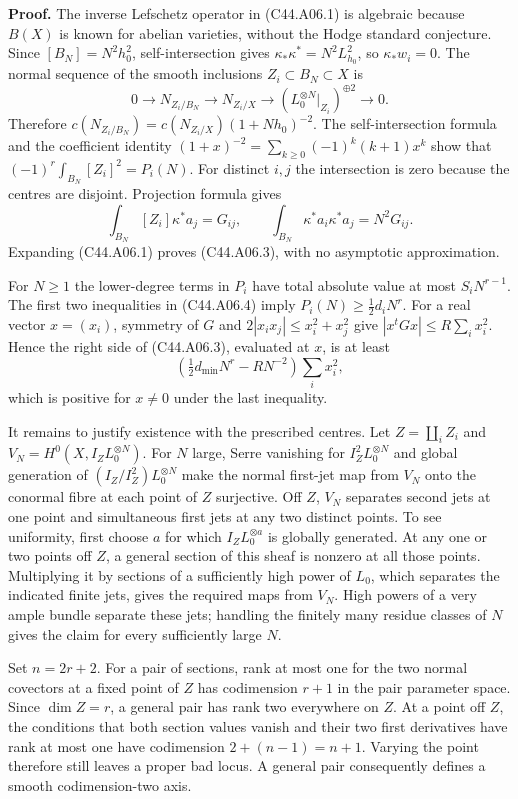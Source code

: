 \documentclass[11pt]{article}
\theoremstyle{remark}\newtheorem{remark}[theorem]{Remark}
\begin{document}
\textbf{Proof.}
The inverse Lefschetz operator in (C44.A06.1) is algebraic because
$B(X)$ is known for abelian varieties, without the Hodge standard
conjecture. Since $[B_N]=N^2h_0^2$, self-intersection gives
$\kappa_*\kappa^*=N^2L_{h_0}^2$, so $\kappa_*w_i=0$.
The normal sequence of the smooth inclusions $Z_i\subset B_N\subset X$
is
\[
 0\longrightarrow N_{Z_i/B_N}\longrightarrow N_{Z_i/X}
 \longrightarrow (L_0^{\otimes N}|_{Z_i})^{\oplus2}
 \longrightarrow0.
\]
Therefore
$c(N_{Z_i/B_N})=c(N_{Z_i/X})(1+Nh_0)^{-2}$.
The self-intersection formula and the coefficient identity
$(1+x)^{-2}=\sum_{k\ge0}(-1)^k(k+1)x^k$ show that
$(-1)^r\int_{B_N}[Z_i]^2=P_i(N)$.
For distinct $i,j$ the intersection is zero because the centres
are disjoint. Projection formula gives
\[
 \int_{B_N}[Z_i]\kappa^*a_j=G_{ij},\qquad
 \int_{B_N}\kappa^*a_i\kappa^*a_j=N^2G_{ij}.
\]
Expanding (C44.A06.1) proves (C44.A06.3), with no asymptotic
approximation.

For $N\ge1$ the lower-degree terms in $P_i$ have total absolute
value at most $S_iN^{r-1}$. The first two inequalities in
(C44.A06.4) imply $P_i(N)\ge\tfrac12d_iN^r$.
For a real vector $x=(x_i)$, symmetry of $G$ and
$2|x_ix_j|\le x_i^2+x_j^2$ give
$|x^tGx|\le R\sum_i x_i^2$. Hence the right side of
(C44.A06.3), evaluated at $x$, is at least
\[
 \left(\tfrac12d_{\min}N^r-RN^{-2}\right)\sum_i x_i^2,
\]
which is positive for $x\ne0$ under the last inequality.

It remains to justify existence with the prescribed centres.
Let $Z=\coprod_iZ_i$ and $V_N=H^0(X,I_ZL_0^{\otimes N})$.
For $N$ large, Serre vanishing for $I_Z^2L_0^{\otimes N}$ and
global generation of $(I_Z/I_Z^2)L_0^{\otimes N}$ make the
normal first-jet map from $V_N$ onto the conormal fibre at each
point of $Z$ surjective. Off $Z$, $V_N$ separates second jets at
one point and simultaneous first jets at any two distinct points.
To see uniformity, first choose $a$ for which $I_ZL_0^{\otimes a}$
is globally generated. At any one or two points off $Z$, a general
section of this sheaf is nonzero at all those points. Multiplying
it by sections of a sufficiently high power of $L_0$, which
separates the indicated finite jets, gives the required maps from
$V_N$. High powers of a very ample bundle separate these jets;
handling the finitely many residue classes of $N$ gives the claim
for every sufficiently large $N$.

Set $n=2r+2$. For a pair of sections, rank at most one for the
two normal covectors at a fixed point of $Z$ has codimension
$r+1$ in the pair parameter space. Since $\dim Z=r$, a general
pair has rank two everywhere on $Z$. At a point off $Z$, the
conditions that both section values vanish and their two first
derivatives have rank at most one have codimension
$2+(n-1)=n+1$. Varying the point therefore still leaves a proper
bad locus. A general pair consequently defines a smooth
codimension-two axis.
\end{document}
